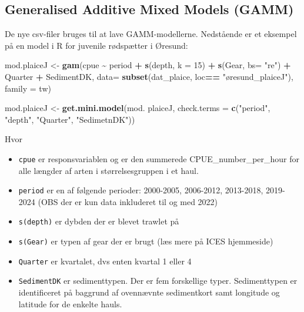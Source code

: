 \documentclass[
]{article}
\newenvironment{Shaded}{\begin{snugshade}}{\end{snugshade}}
\newcommand{\AttributeTok}[1]{\textcolor[rgb]{0.13,0.29,0.53}{#1}}
\newcommand{\DecValTok}[1]{\textcolor[rgb]{0.00,0.00,0.81}{#1}}
\newcommand{\FunctionTok}[1]{\textcolor[rgb]{0.13,0.29,0.53}{\textbf{#1}}}
\newcommand{\NormalTok}[1]{#1}
\newcommand{\OtherTok}[1]{\textcolor[rgb]{0.56,0.35,0.01}{#1}}
\newcommand{\SpecialCharTok}[1]{\textcolor[rgb]{0.81,0.36,0.00}{\textbf{#1}}}
\newcommand{\StringTok}[1]{\textcolor[rgb]{0.31,0.60,0.02}{#1}}
\providecommand{\tightlist}{%
  \setlength{\itemsep}{0pt}\setlength{\parskip}{0pt}}
\begin{document}
\hypertarget{generalised-additive-mixed-models-gamm}{%
\subsection{Generalised Additive Mixed Models
(GAMM)}\label{generalised-additive-mixed-models-gamm}}

De nye csv-filer bruges til at lave GAMM-modellerne. Nedstående er et
eksempel på en model i R for juvenile rødspætter i Øresund:

\begin{Shaded}
\begin{Highlighting}[]
\NormalTok{mod.plaiceJ }\OtherTok{\textless{}{-}} \FunctionTok{gam}\NormalTok{(cpue }\SpecialCharTok{\textasciitilde{}}
\NormalTok{                     period }\SpecialCharTok{+}
                     \FunctionTok{s}\NormalTok{(depth, }\AttributeTok{k =} \DecValTok{15}\NormalTok{) }\SpecialCharTok{+} 
                     \FunctionTok{s}\NormalTok{(Gear, }\AttributeTok{bs=} \StringTok{"re"}\NormalTok{) }\SpecialCharTok{+} 
\NormalTok{                     Quarter }\SpecialCharTok{+} 
\NormalTok{                     SedimentDK, }
                   \AttributeTok{data=} \FunctionTok{subset}\NormalTok{(dat\_plaice, loc}\SpecialCharTok{==} \StringTok{"øresund\_plaiceJ"}\NormalTok{), }\AttributeTok{family =}\NormalTok{ tw)}

\NormalTok{mod.plaiceJ }\OtherTok{\textless{}{-}} \FunctionTok{get.mini.model}\NormalTok{(mod. plaiceJ, }\AttributeTok{check.terms =} \FunctionTok{c}\NormalTok{(}\StringTok{"period"}\NormalTok{, }\StringTok{"depth"}\NormalTok{, }\StringTok{"Quarter"}\NormalTok{, }\StringTok{"SedimetnDK"}\NormalTok{))}
\end{Highlighting}
\end{Shaded}

Hvor

\begin{itemize}
\tightlist
\item
  \texttt{cpue} er responsvariablen og er den summerede
  CPUE\_number\_per\_hour for alle længder af arten i størrelsesgruppen
  i et haul.
\item
  \texttt{period} er en af følgende perioder: 2000-2005, 2006-2012,
  2013-2018, 2019-2024 (OBS der er kun data inkluderet til og med 2022)
\item
  \texttt{s(depth)} er dybden der er blevet trawlet på
\item
  \texttt{s(Gear)} er typen af gear der er brugt (læs mere på ICES
  hjemmeside)
\item
  \texttt{Quarter} er kvartalet, dvs enten kvartal 1 eller 4
\item
  \texttt{SedimentDK} er sedimenttypen. Der er fem forskellige typer.
  Sedimenttypen er identificeret på baggrund af ovennævnte sedimentkort
  samt longitude og latitude for de enkelte hauls.
\end{itemize}
\end{document}
